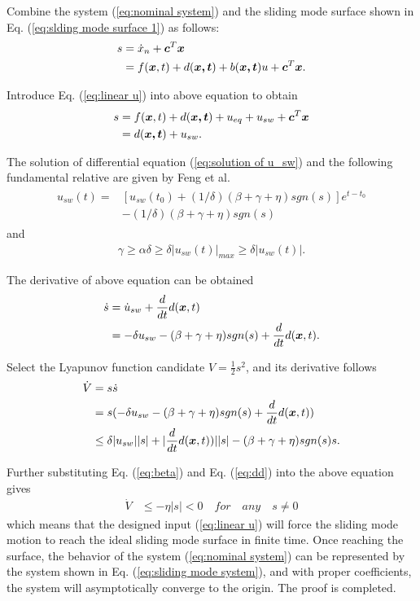 \documentclass[conference]{IEEEtran}
\theoremstyle{plain}
\begin{document}
\begin{IEEEproof}
Combine the system (\ref{eq:nominal system}) and the sliding mode surface shown in Eq. (\ref{eq:slding mode surface 1}) as follows:
\begin{align}
s   &=\dot x_n +\bm{c}^T\bm{x}\notag\\
    &=f(\bm{x},t)+d(\bm{x,t})+b(\bm{x,t})u+\bm{c}^T\bm{x}.\label{eq:linear sliding mode}
\end{align}\par
Introduce Eq. (\ref{eq:linear u}) into above equation to obtain
\begin{align}
s   &= f(\bm{x},t)+d(\bm{x,t})+u_{eq}+u_{sw}+\bm{c}^T\bm{x}\notag\\
    &= d(\bm{x,t})+u_{sw}.\notag
\end{align}\par
The solution of differential equation (\ref{eq:solution of u_sw}) and the following fundamental relative are given by Feng et al.~\cite{feng2014chattering}
\begin{align}
\begin{split}
u_{sw}(t) = & [u_{sw}(t_0)+(1/\delta)(\beta+\gamma+\eta)sgn(s)]e^{t-t_0}\\
            & -(1/\delta)(\beta+\gamma+\eta)sgn(s)
\end{split}
\end{align}
and
\begin{align}
\gamma\ge\alpha \delta\ge \delta\vert u_{sw}(t)\vert_{max}\ge \delta\vert u_{sw}(t)\vert.\label{eq:beta}
\end{align}\par
The derivative of above equation can be obtained
\begin{align}
\dot s  &= \dot u_{sw}+\frac{d}{dt}d(\bm{x},t)\notag\\
        &= -\delta u_{sw} - (\beta+\gamma+\eta)sgn(s)+\frac{d}{dt}d(\bm{x},t).
\end{align}\par
Select the Lyapunov function candidate $V=\frac{1}{2}s^2$, and its derivative follows
\begin{align}
\dot V  &= s\dot s\notag\\
        &= s(-\delta u_{sw} - (\beta+\gamma+\eta)sgn(s)+\frac{d}{dt}d(\bm{x},t))\notag\\
        &\le \delta\vert u_{sw}\vert\vert s\vert+\vert \frac{d}{dt}d(\bm{x},t))\vert\vert s\vert -(\beta+\gamma+\eta)sgn(s)s.\notag
\end{align}\par
Further substituting Eq. (\ref{eq:beta}) and Eq. (\ref{eq:dd}) into the above equation gives
\begin{align}
\dot V  &\le -\eta\vert s\vert<0 \quad for\quad any\quad s\neq 0
\end{align}
which means that the designed input (\ref{eq:linear u}) will force the sliding mode motion to reach the ideal sliding mode surface in finite time. Once reaching the surface, the behavior of the system (\ref{eq:nominal system}) can be represented by the system shown in Eq. (\ref{eq:sliding mode system}), and with proper coefficients, the system will asymptotically converge to the origin. The proof is completed.
\end{IEEEproof}
\end{document}
